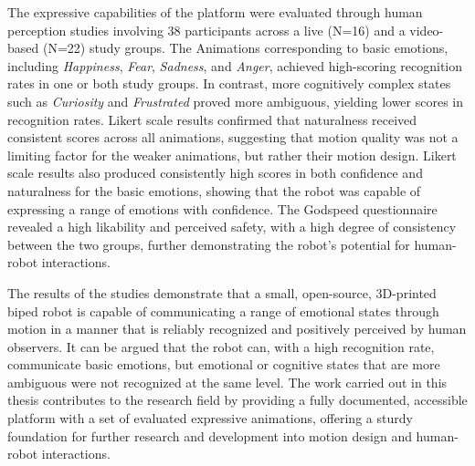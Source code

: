 The expressive capabilities of the platform were evaluated through human perception studies involving 38 participants across a live (N=16) and a video-based (N=22) study groups. The Animations corresponding to basic emotions, including \textit{Happiness}, \textit{Fear}, \textit{Sadness}, and \textit{Anger}, achieved high-scoring recognition rates in one or both study groups. In contrast, more cognitively complex states such as \textit{Curiosity} and \textit{Frustrated} proved more ambiguous, yielding lower scores in recognition rates.  Likert scale results confirmed that naturalness received consistent scores across all animations, suggesting that motion quality was not a limiting factor for the weaker animations, but rather their motion design. Likert scale results also produced consistently high scores in both confidence and naturalness for the basic emotions, showing that the robot was capable of expressing a range of emotions with confidence. The Godspeed questionnaire 
revealed a high likability and perceived safety, with a high degree of consistency between the two groups, further demonstrating the robot's potential for human-robot interactions.

The results of the studies demonstrate that a small, open-source, 3D-printed biped robot is capable of communicating a range of emotional states through motion in a manner that is reliably recognized and positively perceived by human observers. It can be argued that the robot can, with a high recognition rate, communicate basic emotions, but emotional or cognitive states that are more ambiguous were not recognized at the same level. The work carried out in this thesis contributes to the research field by providing a fully documented, accessible platform with a set of evaluated expressive animations, offering a sturdy foundation for further research and development into motion design and human-robot interactions.